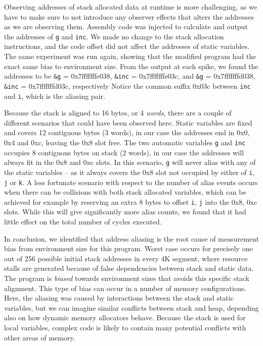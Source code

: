 \documentclass[prodmode,acmtaco]{acmsmall}
\begin{document}
Observing addresses of stack allocated data at runtime is more challenging, as we have to make sure to not introduce any observer effects that alters the addresses as we are observing them.
Assembly code was injected to calculate and output the addresses of \texttt{g} and \texttt{inc}.
We made no change to the stack allocation instructions, and the code offset did not affect the addresses of static variables.
The same experiment was run again, showing that the modified program had the exact same bias to environment size.
From the output at each spike, we found the addresses to be \texttt{\&g} = 0x7fffffffe038, \texttt{\&inc} = 0x7fffffffe03c, and \texttt{\&g} = 0x7fffffffd038, \texttt{\&inc} = 0x7fffffffd03c, respectively
Notice the common suffix 0x03c between \texttt{inc} and \texttt{i}, which is the aliasing pair.


% 

Because the stack is aligned to 16 bytes, or 4 \emph{words}, there are a couple of different scenarios that could have been observed here.
Static variables are fixed and covers 12 contiguous bytes (3 words), in our case the addresses end in 0x0, 0x4 and 0xc, leaving the 0x8 slot free.
The two automatic variables \texttt{g} and \texttt{inc} occupies 8 contiguous bytes on stack (2 words), in our case the addresses will always fit in the 0x8 and 0xc slots.
In this scenario, \texttt{g} will never alias with any of the static variables -- as it always covers the 0x8 slot not occupied by either of \texttt{i}, \texttt{j} or \texttt{k}.
A less fortunate scenario with respect to the number of alias events occurs when there can be collisions with both stack allocated variables, which can be achieved for example by reserving an extra 8 bytes to offset \texttt{i}, \texttt{j} into the 0x8, 0xc slots. 
While this will give significantly more alias counts, we found that it had little effect on the total number of cycles executed.

In conclusion, we identified that address aliasing is the root cause of measurement bias from environment size for this program.
Worst case occurs for precisely one out of 256 possible initial stack addresses in every 4K segment, where resource stalls are generated because of false dependencies between stack and static data.
The program is \emph{biased} towards environment sizes that avoids this specific stack alignment.
This type of bias can occur in a number of memory configurations.
Here, the aliasing was caused by interactions between the stack and static variables, but we can imagine similar conflicts between stack and heap, depending also on how dynamic memory allocators behave.
Because the stack is used for local variables, complex code is likely to contain many potential conflicts with other areas of memory.
\end{document}
